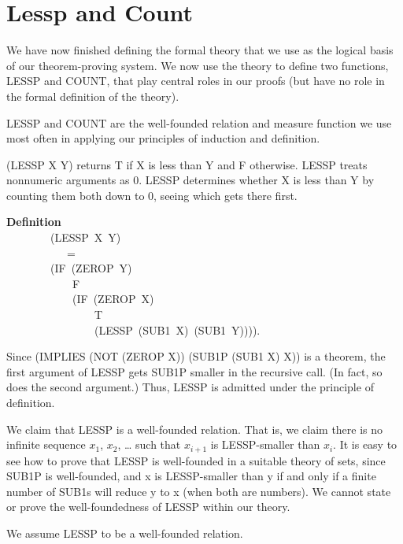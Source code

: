 \documentclass[10pt]{book}
\newenvironment{pubasis}{\begin{flushleft}}{\end{flushleft}}
\newcommand{\axiomordefinition}[1]{\vspace{6pt}\Large\textsf{\textbf{#1}}\normalsize}
\begin{document}
\section{Lessp and Count}
\label{SSLESSP}
We have now finished defining the formal theory that
we use as the logical basis of our theorem-proving system.
We now  use the theory to define two  functions, LESSP
and COUNT, that play central roles in our proofs (but have
no role in the formal definition of the theory).

LESSP and COUNT are the well-founded relation and measure function we
use most often in applying our principles of induction and definition.

(LESSP X Y) returns T if X is less than Y and F otherwise.  LESSP
treats nonnumeric arguments as 0.  LESSP determines whether X is less
than Y by counting them both down to 0, seeing which gets there first.

\hrulefill 

\begin{pubasis}
\axiomordefinition{Definition}\\
~~~~~~~~(LESSP~X~Y)\\
~~~~~~~~~~~=\\
~~~~~~~~(IF~(ZEROP~Y)\\
~~~~~~~~~~~~F\\
~~~~~~~~~~~~(IF~(ZEROP~X)\\
~~~~~~~~~~~~~~~~T\\
~~~~~~~~~~~~~~~~(LESSP~(SUB1~X)~(SUB1~Y)))).\\
\end{pubasis}

\hrulefill 

Since (IMPLIES (NOT (ZEROP X)) (SUB1P (SUB1 X) X)) is a theorem,
the first argument of LESSP gets SUB1P smaller in the recursive call.
(In fact, so does the second argument.)  Thus, LESSP
is admitted under the principle
of definition.

We claim that LESSP is a well-founded relation.  That is, we claim
there is no infinite sequence $x_{1}$, $x_{2}$, \ldots{} such that $x_{i+1}$
is LESSP-smaller than $x_{i}$.  It is easy to see how to
prove that LESSP is well-founded in a suitable theory of sets,
since SUB1P is well-founded, 
and x is LESSP-smaller than y if and only if a finite number of SUB1s will
reduce y to x (when both are numbers).  We cannot state or
prove the well-foundedness of LESSP within our theory.

\hrulefill 

We assume LESSP to be a well-founded relation.
\end{document}
